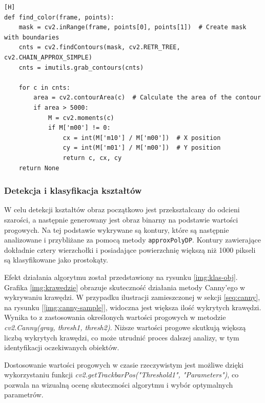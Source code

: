 \vspace*{0.5cm}


\begin{lstlisting}[caption=Kod odpowiedzialny za detekcję kolorów klocków, label=fig:color_detection, captionpos=b][H]
def find_color(frame, points):
    mask = cv2.inRange(frame, points[0], points[1])  # Create mask with boundaries
    cnts = cv2.findContours(mask, cv2.RETR_TREE, cv2.CHAIN_APPROX_SIMPLE)
    cnts = imutils.grab_contours(cnts)

    for c in cnts:
        area = cv2.contourArea(c)  # Calculate the area of the contour
        if area > 5000:
            M = cv2.moments(c)
            if M['m00'] != 0:
                cx = int(M['m10'] / M['m00'])  # X position
                cy = int(M['m01'] / M['m00'])  # Y position
                return c, cx, cy
    return None
\end{lstlisting}

\subsubsection{Detekcja i klasyfikacja kształtów}

W celu detekcji kształtów obraz początkowo jest przekształcany do odcieni szarości, a następnie generowany jest obraz binarny na podstawie wartości progowych. Na tej podstawie wykrywane są kontury, które są następnie analizowane i przybliżane za pomocą metody \texttt{approxPolyDP}. Kontury zawierające dokładnie cztery wierzchołki i posiadające powierzchnię większą niż 1000 pikseli są klasyfikowane jako prostokąty.

Efekt działania algorytmu został przedstawiony na rysunku \ref{img:klas-obj}. Grafika \ref{img:krawedzie} obrazuje skuteczność działania metody Canny’ego w wykrywaniu krawędzi. W przypadku ilustracji zamieszczonej w sekcji \ref{seq:canny}, na rysunku [\ref{img:canny-sample}], widoczna jest większa ilość wykrytych krawędzi. Wynika to z zastosowania określonych wartości progowych w metodzie \textit{cv2.Canny(gray, thresh1, thresh2)}. Niższe wartości progowe skutkują większą liczbą wykrytych krawędzi, co może utrudnić proces dalszej analizy, w tym identyfikacji oczekiwanych obiektów.

Dostosowanie wartości progowych w czasie rzeczywistym jest możliwe dzięki wykorzystaniu funkcji \textit{cv2.getTrackbarPos("Threshold1", "Parameters")}, co pozwala na wizualną ocenę skuteczności algorytmu i wybór optymalnych parametrów.

\vspace*{0.5cm}


